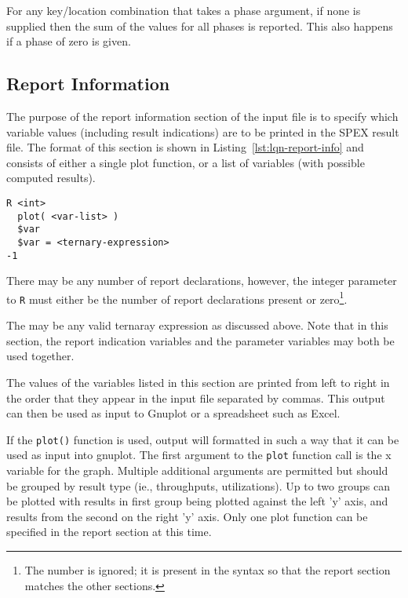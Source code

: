 For any key/location combination that takes a phase argument, if none
is supplied then the sum of the values for all phases is reported.
This also happens if a phase of zero is given.

\label{sec:spex-variables|)}

\subsection{Report Information}
\label{sec:lqn-report-information}

The purpose of the report information section of the input file is to specify which variable values
(including result indications) are to be printed in the SPEX result file.  The format of this section is
shown in Listing~\ref{lst:lqn-report-info} and consists of either a single plot
function, or a list of variables (with possible computed results).  

\lstset{language=LQN,basicstyle=\ttfamily,numbersep=10pt,firstnumber=1}
\begin{lstlisting}[caption={Report Information},label=lst:lqn-report-info,frame=single,float]
R <int>
  plot( <var-list> )
  $var
  $var = <ternary-expression>
-1
\end{lstlisting}

There may be any number of report declarations, however, the integer parameter to \texttt{R} must either be
the number of report declarations present or zero\footnote{The number is ignored; it is present in the
syntax so that the report section matches the other sections.}.

The  may be any valid ternaray expression as discussed above.  Note that in this section,
the report indication variables and the parameter
variables may both be used together. 

The values of the variables listed in this
section are printed from left to right in the order that they appear in the input file separated by commas.
This output can then be used as input to Gnuplot or a spreadsheet such as Excel.

If the \texttt{plot()} function is used, output will formatted in such a way that it
can be used as input into gnuplot.  The first argument to the \texttt{plot}
function call is the x variable for the graph.  Multiple additional arguments are permitted
but should be grouped by result type (ie., throughputs, utilizations).  Up to two groups can be plotted with
results in first group being plotted against the left 'y' axis, and results from the second on
the right 'y' axis.  Only one plot function can be specified in the report section at this time.

